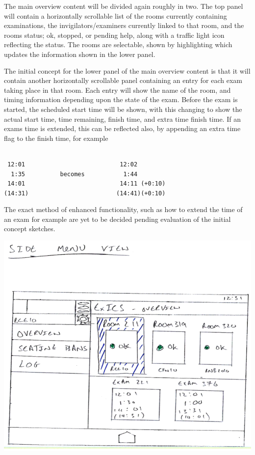 The main overview content will be divided again roughly in two.  The top panel will contain a horizontally scrollable list of the rooms currently containing examinations, the invigilators/examiners currently linked to that room, and the rooms status; ok, stopped, or pending help, along with a traffic light icon reflecting the status.  The rooms are selectable, shown by highlighting which updates the information shown in the lower panel.

The initial concept for the lower panel of the main overview content is that it will contain another horizontally scrollable panel containing an entry for each exam taking place in that room.  Each entry will show the name of the room, and timing information depending upon the state of the exam.  Before the exam is started, the scheduled start time will be shown, with this changing to show the actual start time, time remaining, finish time, and extra time finish time.  If an exams time is extended, this can be reflected also, by appending an extra time flag to the finish time, for example

\begin{minipage}{\textwidth}
\begin{lstlisting}[captionpos=b,caption=Representation of Examination Timings, tabsize=4, breaklines=true]

 12:01							 12:02
  1:35			becomes			  1:44
 14:01							 14:11 (+0:10)
(14:31)							(14:41)(+0:10)

\end{lstlisting}
\end{minipage}

The exact method of enhanced functionality, such as how to extend the time of an exam for example are yet to be decided pending evaluation of the initial concept sketches.

\includegraphics[width=\textwidth]{"GUI Sketches/Side Menu View Cropped"}

